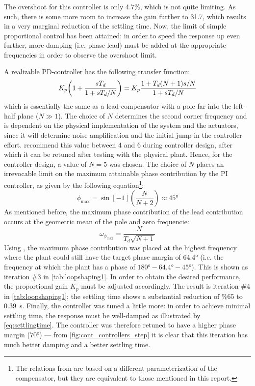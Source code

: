The overshoot for this controller is only 4.7\%, which is not quite limiting. As such, there is some more room to increase the gain further to 31.7, which results in a very marginal reduction of the settling time. Now, the limit of simple proportional control has been attained: in order to speed the response up even further, more damping (i.e. phase lead) must be added at the appropriate frequencies in order to observe the overshoot limit.

A realizable PD-controller has the following transfer function:
\begin{equation}
K_p \qty(1 + \frac{sT_d}{1 + sT_d/N}) = K_p\frac{1 + T_d(N+1)s/N}{1 + sT_d/N}
\label{eq:leadcomp}
\end{equation}
which is essentially the same as a lead-compensator with a pole far into the left-half plane ($N \gg 1$). The choice of $N$ determines the second corner frequency and is dependent on the physical implementation of the system and the actuators, since it will determine noise amplification and the initial jump in the controller effort. \textcite{keviczky} recommend this value between 4 and 6 during controller design, after which it can be retuned after testing with the physical plant. Hence, for the controller design, a value of $N=5$ was chosen. The choice of $N$ places an irrevocable limit on the maximum attainable phase contribution by the PI controller, as given by the following equation\footnote{The relations from \textcite{ogata} are based on a different parameterization of the compensator, but they are equivalent to those mentioned in this report.}: \cite{ogata}
\begin{equation}
\phi_\text{max} = \sin[-1](\frac{N}{N + 2}) \approx \ang{45}
\label{eq:maxphi}
\end{equation}
As mentioned before, the maximum phase contribution of the lead contribution occurs at the geometric mean of the pole and zero frequencie: \cite{ogata}
\begin{equation}
    \omega_{\phi_\text{max}} = \frac{N}{T_d\sqrt{N+1}}
    \label{eq:omegamaxphi}
\end{equation}
Using , the maximum phase contribution was placed at the highest frequency where the plant could still have the target phase margin of \ang{64.4} (i.e. the frequency at which the plant has a phase of $\ang{180} - \ang{64.4}  - \ang{45}$). This is shown as iteration \#3 in \cref{tab:loopshaping1}. In order to obtain the desired performance, the proportional gain $K_p$ must be adjusted accordingly. The result is iteration \#4 in \cref{tab:loopshaping1}; the settling time shows a substantial reduction of \%65 to \SI{0.39}{\second}. Finally, the controller was tuned a little more: in order to achieve minimal settling time, the response must be well-damped as illustrated by \cref{eq:settlingtime}. The controller was therefore retuned to have a higher phase margin (\ang{70}) --- from \cref{fig:cont_controllers_step} it is clear that this iteration has much better damping and a better settling time.
